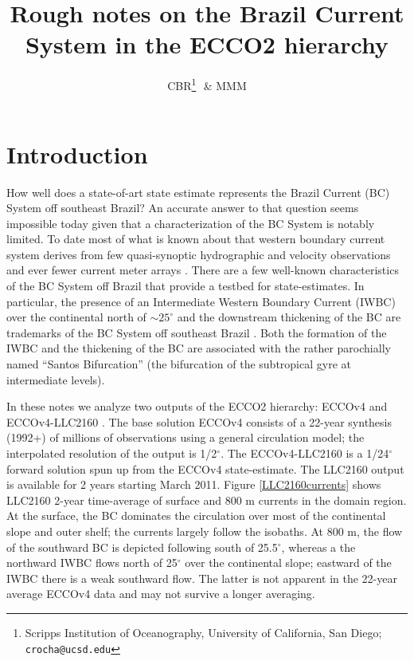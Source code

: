 \documentclass[11pt]{article}
\title{Rough notes on the Brazil Current System in the ECCO2 hierarchy}
\date{}
\author{CBR\thanks{Scripps Institution of Oceanography, University
        of California, San Diego; \texttt{crocha@ucsd.edu}}\,\,\,\,\& MMM}
\begin{document}
\maketitle
\vspace{-1cm}



\section{Introduction}

How well does a state-of-art state estimate represents the Brazil Current (BC) System
off southeast Brazil? An accurate answer to that question seems impossible
today given that a characterization of the BC System is notably limited.
To date most of what is known about that western boundary current system derives
from few quasi-synoptic hydrographic and velocity observations and ever fewer
current meter arrays \cite[and references therein]{rocha_etal2014}. There are a
few well-known characteristics of the BC System off Brazil that provide a testbed
for state-estimates. In particular, the presence of an Intermediate Western Boundary
Current (IWBC) over the continental north of $\sim\!\!25^\circ$ and the downstream thickening of the BC
are trademarks of the BC System off southeast Brazil \citep{rocha_etal2014}.
Both the formation of the IWBC and the thickening of the BC are associated with
the rather parochially named ``Santos Bifurcation'' (the bifurcation of the
subtropical gyre at intermediate levels).

In these notes we analyze two outputs of the ECCO2 hierarchy: ECCOv4 and
ECCOv4-LLC2160 \citep{forget_etal2015}. The base solution ECCOv4 consists of a 22-year synthesis (1992+)
of millions of observations using a general circulation model; the interpolated
resolution of the output is 1/2$^\circ$. The ECCOv4-LLC2160 is a 1/24$^\circ$
forward solution spun up from the ECCOv4 state-estimate. The LLC2160 output is
available for 2 years starting  March 2011. Figure \ref{LLC2160currents} shows
LLC2160 2-year time-average of surface and 800 m currents in the domain region.
At the surface, the BC dominates the circulation over most of the continental
slope and outer shelf; the currents largely follow the isobaths. At 800 m,
the flow of the southward BC is depicted following south of 25.5$^\circ$, whereas
a the northward IWBC flows north of  25$^\circ$ over the continental slope; eastward of
the IWBC there is a weak southward flow. The latter is not apparent in the 22-year average
ECCOv4 data and may not survive a longer averaging.
\end{document}
